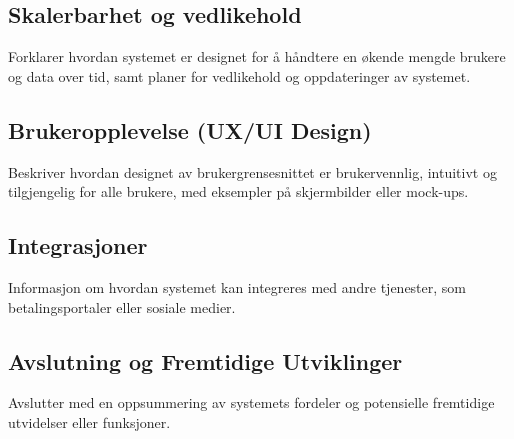 \documentclass[../doc.tex]{subfiles}
\begin{document}
\subsection{Skalerbarhet og vedlikehold}
Forklarer hvordan systemet er designet for å håndtere en økende mengde brukere og data over tid, samt planer for vedlikehold og oppdateringer av systemet.

\subsection{Brukeropplevelse (UX/UI Design)}
Beskriver hvordan designet av brukergrensesnittet er brukervennlig, intuitivt og tilgjengelig for alle brukere, med eksempler på skjermbilder eller mock-ups.

\subsection{Integrasjoner}
Informasjon om hvordan systemet kan integreres med andre tjenester, som betalingsportaler eller sosiale medier.

\subsection{Avslutning og Fremtidige Utviklinger}
Avslutter med en oppsummering av systemets fordeler og potensielle fremtidige utvidelser eller funksjoner.
\end{document}
